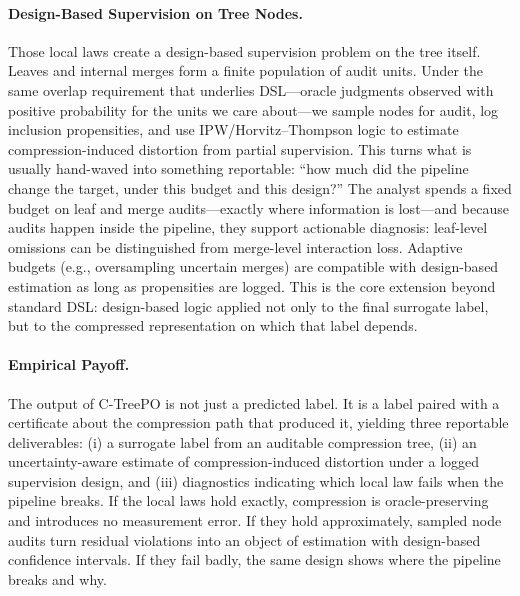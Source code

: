 \documentclass[11pt]{article}
\begin{document}
\paragraph{Design-Based Supervision on Tree Nodes.}
Those local laws create a design-based supervision problem on the tree itself. Leaves and internal merges form a finite population of audit units. Under the same overlap requirement that underlies DSL---oracle judgments observed with positive probability for the units we care about---we sample nodes for audit, log inclusion propensities, and use IPW/Horvitz--Thompson logic to estimate compression-induced distortion from partial supervision. This turns what is usually hand-waved into something reportable: ``how much did the pipeline change the target, under this budget and this design?'' The analyst spends a fixed budget on leaf and merge audits---exactly where information is lost---and because audits happen inside the pipeline, they support actionable diagnosis: leaf-level omissions can be distinguished from merge-level interaction loss. Adaptive budgets (e.g., oversampling uncertain merges) are compatible with design-based estimation as long as propensities are logged. This is the core extension beyond standard DSL: design-based logic applied not only to the final surrogate label, but to the compressed representation on which that label depends.

\paragraph{Empirical Payoff.}
The output of C-TreePO is not just a predicted label. It is a label paired with a certificate about the compression path that produced it, yielding three reportable deliverables: (i) a surrogate label from an auditable compression tree, (ii) an uncertainty-aware estimate of compression-induced distortion under a logged supervision design, and (iii) diagnostics indicating which local law fails when the pipeline breaks. If the local laws hold exactly, compression is oracle-preserving and introduces no measurement error. If they hold approximately, sampled node audits turn residual violations into an object of estimation with design-based confidence intervals. If they fail badly, the same design shows where the pipeline breaks and why.
\end{document}
